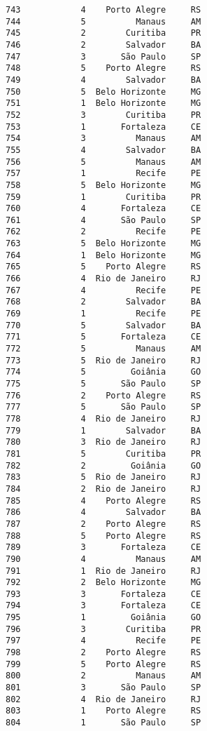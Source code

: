 \documentclass[11pt]{article}
\begin{document}
\begin{Verbatim}[commandchars=\\\{\}]
743            4    Porto Alegre     RS  
744            5          Manaus     AM  
745            2        Curitiba     PR  
746            2        Salvador     BA  
747            3       São Paulo     SP  
748            5    Porto Alegre     RS  
749            4        Salvador     BA  
750            5  Belo Horizonte     MG  
751            1  Belo Horizonte     MG  
752            3        Curitiba     PR  
753            1       Fortaleza     CE  
754            3          Manaus     AM  
755            4        Salvador     BA  
756            5          Manaus     AM  
757            1          Recife     PE  
758            5  Belo Horizonte     MG  
759            1        Curitiba     PR  
760            4       Fortaleza     CE  
761            4       São Paulo     SP  
762            2          Recife     PE  
763            5  Belo Horizonte     MG  
764            1  Belo Horizonte     MG  
765            5    Porto Alegre     RS  
766            4  Rio de Janeiro     RJ  
767            4          Recife     PE  
768            2        Salvador     BA  
769            1          Recife     PE  
770            5        Salvador     BA  
771            5       Fortaleza     CE  
772            5          Manaus     AM  
773            5  Rio de Janeiro     RJ  
774            5         Goiânia     GO  
775            5       São Paulo     SP  
776            2    Porto Alegre     RS  
777            5       São Paulo     SP  
778            4  Rio de Janeiro     RJ  
779            1        Salvador     BA  
780            3  Rio de Janeiro     RJ  
781            5        Curitiba     PR  
782            2         Goiânia     GO  
783            5  Rio de Janeiro     RJ  
784            2  Rio de Janeiro     RJ  
785            4    Porto Alegre     RS  
786            4        Salvador     BA  
787            2    Porto Alegre     RS  
788            5    Porto Alegre     RS  
789            3       Fortaleza     CE  
790            4          Manaus     AM  
791            1  Rio de Janeiro     RJ  
792            2  Belo Horizonte     MG  
793            3       Fortaleza     CE  
794            3       Fortaleza     CE  
795            1         Goiânia     GO  
796            3        Curitiba     PR  
797            4          Recife     PE  
798            2    Porto Alegre     RS  
799            5    Porto Alegre     RS  
800            2          Manaus     AM  
801            3       São Paulo     SP  
802            4  Rio de Janeiro     RJ  
803            1    Porto Alegre     RS  
804            1       São Paulo     SP  

\end{Verbatim}
\end{document}
